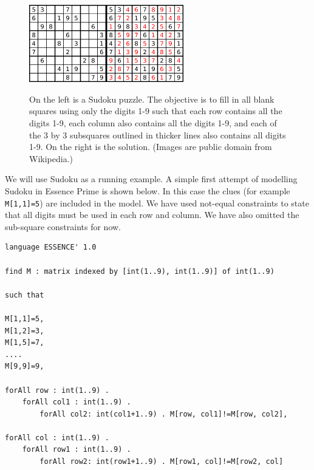 \documentclass[a4paper]{article}
\newcommand{\eprime}{{\sc Essence Prime}\xspace}
\begin{document}
\begin{figure}
\begin{center}
\includegraphics[width=0.3\textwidth]{sudoku-pic}\:\:\includegraphics[width=0.3\textwidth]{sudoku-solution}
\end{center}
\caption{\label{fig:sudoku}On the left is a Sudoku puzzle. The objective is to fill in all blank
squares using only the digits 1-9 such that each row contains all the digits 1-9, each column 
also contains all the digits 1-9, and each of the 3 by 3 subsquares outlined in thicker lines also 
contains all digits 1-9. 
On the right is the solution. 
(Images are public domain from Wikipedia.)
}
\end{figure}

We will use Sudoku as a running example. A simple first attempt of modelling Sudoku
in \eprime is shown below. In this case the clues (for example \texttt{M[1,1]=5}) 
are included in the model. We have used not-equal constraints to state that all 
digits must be used in each row and column. We have also omitted the sub-square
constraints for now. 

\begin{verbatim}
language ESSENCE' 1.0

find M : matrix indexed by [int(1..9), int(1..9)] of int(1..9)

such that

M[1,1]=5,
M[1,2]=3,
M[1,5]=7,
....
M[9,9]=9,

forAll row : int(1..9) . 
    forAll col1 : int(1..9) .
        forAll col2: int(col1+1..9) . M[row, col1]!=M[row, col2],

forAll col : int(1..9) . 
    forAll row1 : int(1..9) .
        forAll row2: int(row1+1..9) . M[row1, col]!=M[row2, col]

\end{verbatim}
\end{document}

